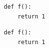 \documentclass{article}
\begin{document}
\begin{Verbatim}
def f():
    return 1
\end{Verbatim}
\begin{Verbatim}[xleftmargin=2em]
def f():
    return 1
\end{Verbatim}
\end{document}
